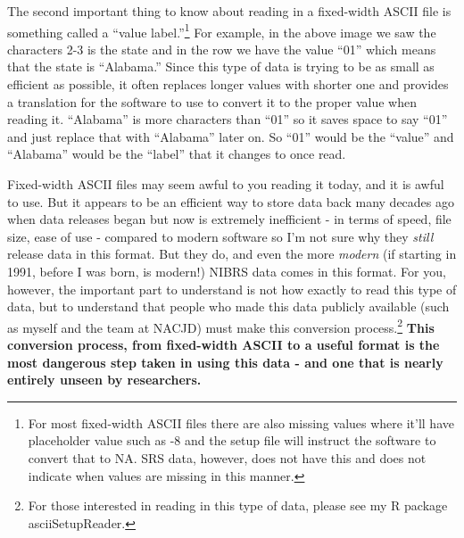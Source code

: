 \documentclass[
  12pt,
  openany]{book}
\begin{document}
The second important thing to know about reading in a fixed-width ASCII file is something called a ``value label.''\footnote{For most fixed-width ASCII files there are also missing values where it'll have placeholder value such as -8 and the setup file will instruct the software to convert that to NA. SRS data, however, does not have this and does not indicate when values are missing in this manner.} For example, in the above image we saw the characters 2-3 is the state and in the row we have the value ``01'' which means that the state is ``Alabama.'' Since this type of data is trying to be as small as efficient as possible, it often replaces longer values with shorter one and provides a translation for the software to use to convert it to the proper value when reading it. ``Alabama'' is more characters than ``01'' so it saves space to say ``01'' and just replace that with ``Alabama'' later on. So ``01'' would be the ``value'' and ``Alabama'' would be the ``label'' that it changes to once read.

Fixed-width ASCII files may seem awful to you reading it today, and it is awful to use. But it appears to be an efficient way to store data back many decades ago when data releases began but now is extremely inefficient - in terms of speed, file size, ease of use - compared to modern software so I'm not sure why they \emph{still} release data in this format. But they do, and even the more \emph{modern} (if starting in 1991, before I was born, is modern!) NIBRS data comes in this format. For you, however, the important part to understand is not how exactly to read this type of data, but to understand that people who made this data publicly available (such as myself and the team at NACJD) must make this conversion process.\footnote{For those interested in reading in this type of data, please see my R package asciiSetupReader.} \textbf{This conversion process, from fixed-width ASCII to a useful format is the most dangerous step taken in using this data - and one that is nearly entirely unseen by researchers.}
\end{document}
